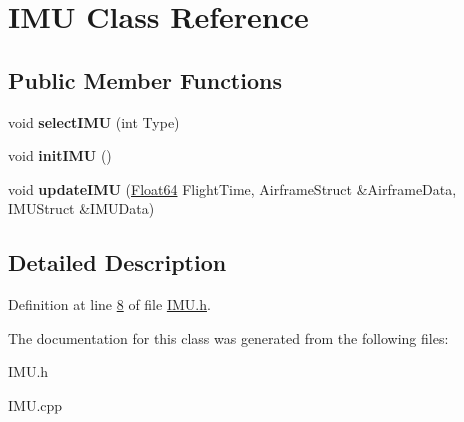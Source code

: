 \hypertarget{class_i_m_u}{}\section{I\+MU Class Reference}
\label{class_i_m_u}
\subsection*{Public Member Functions}
\begin{DoxyCompactItemize}
\item 
\mbox{\label{class_i_m_u_a6a3c828e32f2a299829aba91ede177e2}} 
void {\bfseries select\+I\+MU} (int Type)
\item 
\mbox{\label{class_i_m_u_af9244de2667ca7b28b9e71910a6242ad}} 
void {\bfseries init\+I\+MU} ()
\item 
\mbox{\label{class_i_m_u_a5d5eae8dd965895cde879f51f83bcf3c}} 
void {\bfseries update\+I\+MU} (\hyperlink{group___tools_ga3f1431cb9f76da10f59246d1d743dc2c}{Float64} Flight\+Time, Airframe\+Struct \&Airframe\+Data, I\+M\+U\+Struct \&I\+M\+U\+Data)
\end{DoxyCompactItemize}


\subsection{Detailed Description}


Definition at line \hyperlink{_i_m_u_8h_source_l00008}{8} of file \hyperlink{_i_m_u_8h_source}{I\+M\+U.\+h}.



The documentation for this class was generated from the following files\+:\begin{DoxyCompactItemize}
\item 
I\+M\+U.\+h\item 
I\+M\+U.\+cpp\end{DoxyCompactItemize}
